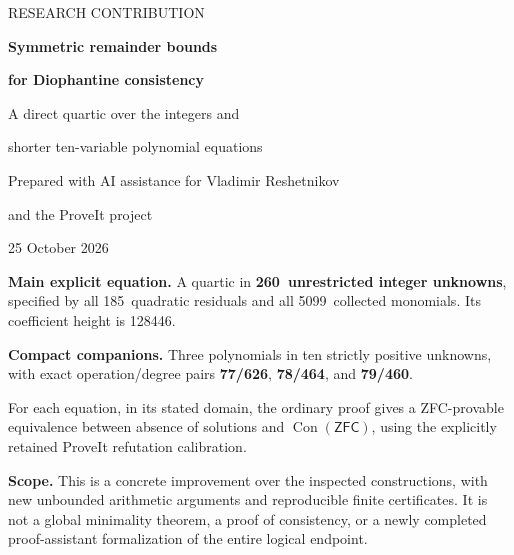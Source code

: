 \documentclass[11pt,letterpaper]{article}
\theoremstyle{definition}\newtheorem{definition}[theorem]{Definition}
\theoremstyle{remark}\newtheorem{remark}[theorem]{Remark}
\newcommand{\Con}{\operatorname{Con}}
\newcommand{\ZFC}{\ensuremath{\mathsf{ZFC}}}
\newcommand{\nvars}{260}
\newcommand{\nrows}{185}
\newcommand{\nterms}{5099}
\newcommand{\nheight}{128446}
\begin{document}
\hypersetup{pageanchor=false}
\begin{titlepage}
\vspace*{0.65in}
{\color{inkblue}\Large RESEARCH CONTRIBUTION}\par
\vspace{0.3in}
{\Huge\bfseries Symmetric remainder bounds\par}
\vspace{0.12in}
{\Huge\bfseries for Diophantine consistency\par}
\vspace{0.32in}
{\Large A direct quartic over the integers and\par shorter ten-variable polynomial equations\par}
\vspace{0.5in}
Prepared with AI assistance for Vladimir Reshetnikov\par
and the ProveIt project\par
25 October 2026\par
\vspace{0.48in}
\begingroup\setlength{\fboxsep}{13pt}
\colorbox{softblue}{\parbox{0.89\textwidth}{
\textbf{Main explicit equation.} A quartic in \textbf{\nvars\ unrestricted integer unknowns}, specified by all \nrows\ quadratic residuals and all \nterms\ collected monomials. Its coefficient height is \nheight.

\textbf{Compact companions.} Three polynomials in ten strictly positive unknowns, with exact operation/degree pairs \textbf{77/626}, \textbf{78/464}, and \textbf{79/460}.

For each equation, in its stated domain, the ordinary proof gives a ZFC-provable equivalence between absence of solutions and \(\Con(\ZFC)\), using the explicitly retained ProveIt refutation calibration.}}
\endgroup
\vfill
\textbf{Scope.} This is a concrete improvement over the inspected constructions, with new unbounded arithmetic arguments and reproducible finite certificates. It is not a global minimality theorem, a proof of consistency, or a newly completed proof-assistant formalization of the entire logical endpoint.
\end{titlepage}
\hypersetup{pageanchor=true}
\end{document}
